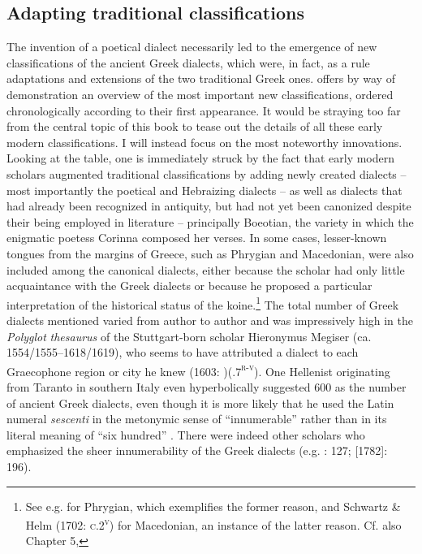 \documentclass[output=paper]{langsci/langscibook}
\begin{document}
\subsection{Adapting traditional classifications}
\hypertarget{Toc19704814}{}
The invention of a poetical dialect necessarily led to the emergence of new classifications of the ancient Greek dialects, which were, in fact, as a rule adaptations and extensions of the two traditional Greek ones.  offers by way of demonstration an overview of the most important new classifications, ordered chronologically according to their first appearance. It would be straying too far from the central topic of this book to tease out the details of all these early modern classifications. I will instead focus on the most noteworthy innovations. Looking at the table, one is immediately struck by the fact that early modern scholars augmented traditional classifications by adding newly created dialects – most importantly the poetical and Hebraizing dialects – as well as dialects that had already been recognized in antiquity, but had not yet been canonized despite their being employed in literature – principally Boeotian, the variety in which the enigmatic poetess Corinna composed her verses. In some cases, lesser-known tongues from the margins of Greece, such as Phrygian and Macedonian, were also included among the canonical dialects, either because the scholar had only little acquaintance with the Greek dialects or because he proposed a particular interpretation of the historical status of the koine.\footnote{See e.g. \citet[131]{Kircher1679} for Phrygian, which exemplifies the former reason, and Schwartz \& Helm (1702: \textsc{c.2}\textsc{\textsuperscript{v}}) for Macedonian, an instance of the latter reason. Cf. also Chapter 5, } The total number of Greek dialects mentioned varied from author to author and was impressively high in the \textit{Polyglot} \textit{thesaurus} of the Stuttgart-born scholar Hieronymus Megiser (ca. 1554/1555–1618/1619), who seems to have attributed a dialect to each Graecophone region or city he knew (1603: )(.7\textsc{\textsuperscript{r-v}}). One Hellenist originating from Taranto in southern Italy even hyperbolically suggested 600 as the number of ancient Greek dialects, even though it is more likely that he used the Latin numeral \textit{sescenti} in the metonymic sense of “innumerable” rather than in its literal meaning of “six hundred” \citep[9]{Giovane1589}. There were indeed other scholars who emphasized the sheer innumerability of the Greek dialects (e.g. \citealt{Bischoff1708}: 127; \citealt{Ries1786} [1782]: 196).
\end{document}
